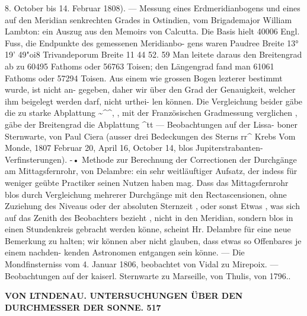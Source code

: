 \documentclass[12pt,a4paper]{article}
\begin{document}
8.  October  bis  14.  Februar  1808).  ---  Messung  eines  Erdmeridianbogens  und  eines  auf  den Meridian  senkrechten  Grades  in  Ostindien,  vom  Brigademajor  William  Lambton:  ein  Auszug  aus  den Memoirs  von  Calcutta.  Die  Basis  hielt  40006  Engl.  Fuss,  die  Endpunkte  des  gemessenen  Meridianbo- gens  waren Paudree  Breite     13°  19'    49"oi8 Trivandeporum     Breite     11     44     52.   59 Man  leitete  daraus  den  Breitengrad  ab  zu  60495  Fathoms  oder  56763  Toisen;  den  Längengrad  fand  man 61061  Fathoms  oder  57294  Toisen.  Aus  einem  wie  grossen  Bogen  lezterer  bestimmt  wurde,  ist  nicht  an- gegeben, daher  wir  über  den  Grad  der  Genauigkeit,  welcher  ihm  beigelegt  werden  darf,  nicht  urthei- len  können.  Die  Vergleichung  beider  gäbe  die  zu  starke  Abplattung  \textasciitilde{}\textasciicircum{}\textasciicircum{}, ,  mit  der  Französischen Gradmessung  verglichen ,  gäbe  der  Breitengrad  die  Abplattung  \textasciicircum{}tt  ---  Beobachtungen  auf  der  Lissa- boner Sternwarte,  von  Paul  Ciera  (ausser  drei  Bedeckungen  des  Sterns  rr\textasciicircum{}  Krebs  Vom  Monde,  1807 Februar  20,  April  16,  October  14,  blos  Jupiterstrabanten- Verfinsterungen).  -•  Methode  zur  Berechnung der  Correctionen  der  Durchgänge  am  Mittagsfernrohr,  von  Delambre:  ein  sehr  weitläuftiger  Aufsatz,  der indess  für  weniger  geübte  Practiker  seinen  Nutzen  haben  mag.  Dass  das  Mittagsfernrohr  blos  durch Vergleichung  mehrerer  Durchgänge  mit  den  Rectascensionen,  ohne  Zuziehung  des  Niveaus  oder  der absoluten  Sternzeit ,  oder  sonst  Etwas ,  was  sich  auf  das  Zenith  des  Beobachters  bezieht ,  nicht  in  den Meridian,  sondern  blos  in  einen  Stundenkreis  gebracht  werden  könne,  scheint  Hr.  Delambre  für  eine neue  Bemerkung  zu  halten;  wir  können  aber  nicht  glauben,  dass  etwas  so  Offenbares  je  einem  nachden- kenden Astronomen  entgangen  sein  könne.  ---  Die  Mondfinsterniss  vom  4.  Januar  1806,  beobachtet  von Vidal  zu  Mirepoix.  ---    Beobachtungen  auf  der  kaiserl.  Sternwarte  zu  Marseille,  von  Thulis,  von  1796..

\vspace{0.5em}


\noindent\textbf{VON  LTNDENAU.     UNTERSUCHUNGEN  ÜBER  DEN  DURCHMESSER  DER  SONNE.  517}
\end{document}
